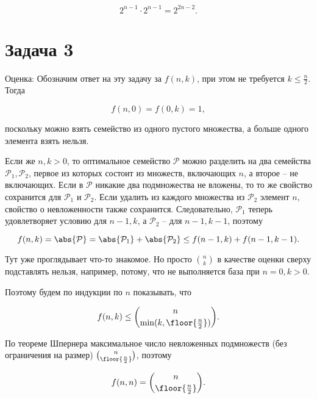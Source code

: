 	\begin{equation*}
		2^{n-1} \cdot 2^{n-1} = 2^{2n-2}.
	\end{equation*}


	\section*{Задача 3}

	Оценка: Обозначим ответ на эту задачу за $f(n, k)$, при этом не требуется $k \le \frac{n}{2}$. Тогда

	\begin{equation*}
		f(n, 0) = f(0, k) = 1,
	\end{equation*}

	поскольку можно взять семейство из одного пустого множества, а больше одного элемента взять нельзя.

	Если же $n, k > 0$, то оптимальное семейство $\mathcal{P}$ можно разделить на два семейства $\mathcal{P}_1, \mathcal{P}_2$, первое из которых состоит из множеств, включающих $n$, а второе -- не включающих. Если в $\mathcal{P}$ никакие два подмножества не вложены, то то же свойство сохранится для $\mathcal{P}_1$ и $\mathcal{P}_2$. Если удалить из каждого множества из $\mathcal{P}_2$ элемент $n$, свойство о невложенности также сохранится. Следовательно, $\mathcal{P}_1$ теперь удовлетворяет условию для $n-1, k$, а $\mathcal{P}_2$ -- для $n-1, k-1$, поэтому

	\begin{equation*}
		f(n, k) = \abs{\mathcal{P}} = \abs{\mathcal{P}_1} + \abs{\mathcal{P}_2} \le f(n-1, k) + f(n-1, k-1).
	\end{equation*}

	Тут уже проглядывает что-то знакомое. Но просто $\binom{n}{k}$ в качестве оценки сверху подставлять нельзя, например, потому, что не выполняется база при $n = 0, k > 0$.

	Поэтому будем по индукции по $n$ показывать, что

	\begin{equation*}
		f(n, k) \le \binom{n}{\min(k, \floor{\frac{n}{2}})}.
	\end{equation*}

	По теореме Шпернера максимальное число невложенных подмножеств (без ограничения на размер) $\binom{n}{\floor{\frac{n}{2}}}$, поэтому

	\begin{equation*}
		f(n, n) = \binom{n}{\floor{\frac{n}{2}}}.
	\end{equation*}

